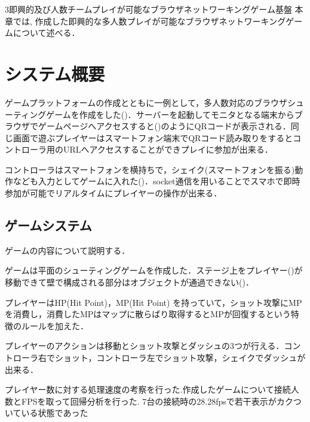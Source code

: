 \chapterhead
{3}{即興的及び人数チームプレイが可能なブラウザネットワーキングゲーム基盤}
{本章では, 作成した即興的な多人数プレイが可能なブラウザネットワーキングゲームについて述べる．}


\section{システム概要}
ゲームプラットフォームの作成とともに一例として，多人数対応のブラウザシューティングゲームを作成をした()．サーバーを起動してモニタとなる端末からブラウザでゲームページへアクセスすると()のようにQRコードが表示される．同じ画面で遊ぶプレイヤーはスマートフォン端末でQRコード読み取りをするとコントローラ用のURLへアクセスすることができプレイに参加が出来る．

コントローラはスマートフォンを横持ちで，シェイク(スマートフォンを振る)動作なども入力としてゲームに入れた()．socket通信を用いることでスマホで即時参加が可能でリアルタイムにプレイヤーの操作が出来る．


\subsection{ゲームシステム}
ゲームの内容について説明する．

ゲームは平面のシューティングゲームを作成した．ステージ上をプレイヤー()が移動できて壁で構成される部分はオブジェクトが通過できない()．

プレイヤーはHP(Hit Point)，MP(Hit Point) を持っていて，ショット攻撃にMPを消費し，消費したMPはマップに散らばり取得するとMPが回復するという特徴のルールを加えた．

プレイヤーのアクションは移動とショット攻撃とダッシュの3つが行える．コントローラ右でショット，コントローラ左でショット攻撃，シェイクでダッシュが出来る．

プレイヤー数に対する処理速度の考察を行った.作成したゲームについて接続人数とFPSを取って回帰分析を行った.
7台の接続時の28.28fpsで若干表示がカクついている状態であった


